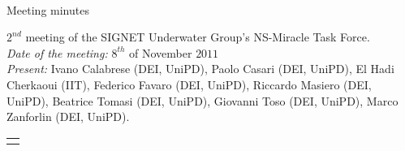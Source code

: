 \documentclass[11pt,journal,draftclsnofoot,onecolumn,twoside,letterpaper]{IEEEtran}
\theoremstyle{definition} \newtheorem{definition}[]{Definition}
\theoremstyle{theorem} \newtheorem{theorem}[]{Theorem}
\begin{document}
\pagestyle{empty}

\begin{Large} \\ \end{Large}
\begin{large} {Meeting minutes} \end{large}

\vspace{0.8cm}

 $2^{nd}$ meeting of the SIGNET Underwater Group's NS-Miracle Task Force.\\
{\it Date of the meeting: } $8^{th}$ of November $2011$\\
{\it Present: } Ivano Calabrese (DEI, UniPD), Paolo Casari (DEI, UniPD), El Hadi Cherkaoui (IIT), Federico Favaro (DEI, UniPD), Riccardo Masiero (DEI, UniPD), Beatrice Tomasi (DEI, UniPD), Giovanni Toso (DEI, UniPD), Marco Zanforlin (DEI, UniPD).

\vspace{0.5cm}

\begin{tabular}{p{}}
 \hline \\
\end{tabular}
\end{document}
